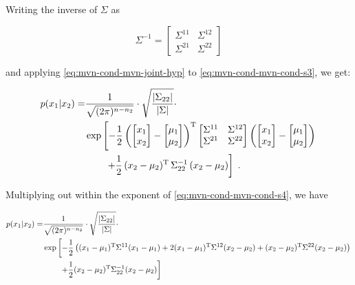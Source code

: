 \documentclass[a4paper,12pt,twoside]{book}
\begin{document}
Writing the inverse of $\Sigma$ as

\begin{equation} \label{eq:mvn-cond-Sigma-inv-def}
\Sigma^{-1} = \begin{bmatrix} \Sigma^{11} & \Sigma^{12} \\ \Sigma^{21} & \Sigma^{22} \end{bmatrix}
\end{equation}

and applying \eqref{eq:mvn-cond-mvn-joint-hyp} to \eqref{eq:mvn-cond-mvn-cond-s3}, we get:

\begin{equation} \label{eq:mvn-cond-mvn-cond-s4}
\begin{split}
p(x_1|x_2) = &\frac{1}{\sqrt{(2 \pi)^{n-n_2}}} \cdot \sqrt{\frac{|\Sigma_{22}|}{|\Sigma|}} \cdot \\
&\exp \left[ -\frac{1}{2} \left( \begin{bmatrix} x_1 \\ x_2 \end{bmatrix} - \begin{bmatrix} \mu_1 \\ \mu_2 \end{bmatrix} \right)^\mathrm{T} \begin{bmatrix} \Sigma^{11} & \Sigma^{12} \\ \Sigma^{21} & \Sigma^{22} \end{bmatrix} \left( \begin{bmatrix} x_1 \\ x_2 \end{bmatrix} - \begin{bmatrix} \mu_1 \\ \mu_2 \end{bmatrix} \right) \right. \\
&\hphantom{\exp \left[\right.} \left. + \frac{1}{2} \, (x_2-\mu_2)^\mathrm{T} \, \Sigma_{22}^{-1} \, (x_2-\mu_2) \right] \; .
\end{split}
\end{equation}

Multiplying out within the exponent of \eqref{eq:mvn-cond-mvn-cond-s4}, we have

\begin{equation} \label{eq:mvn-cond-mvn-cond-s5}
\begin{split}
p(x_1|x_2) = &\frac{1}{\sqrt{(2 \pi)^{n-n_2}}} \cdot \sqrt{\frac{|\Sigma_{22}|}{|\Sigma|}} \cdot \\
&\exp \left[ -\frac{1}{2} \left( (x_1-\mu_1)^\mathrm{T} \Sigma^{11} (x_1-\mu_1) + 2 (x_1-\mu_1)^\mathrm{T} \Sigma^{12} (x_2-\mu_2) + (x_2-\mu_2)^\mathrm{T} \Sigma^{22} (x_2-\mu_2) \right) \right. \\
&\hphantom{\exp \left[\right.} \left. + \frac{1}{2} (x_2-\mu_2)^\mathrm{T} \Sigma_{22}^{-1} (x_2-\mu_2) \right]
\end{split}
\end{equation}
\end{document}
